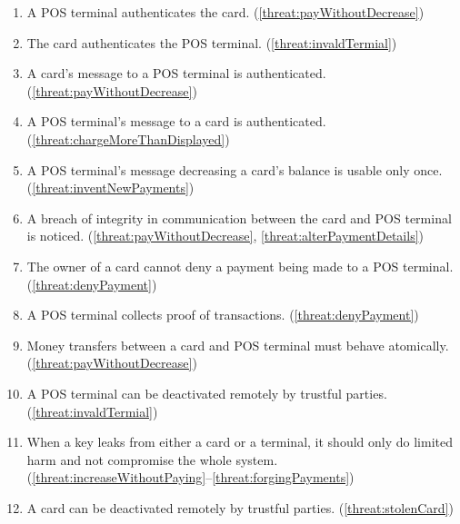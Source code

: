 \begin{enumerate}[label={SR\arabic*:}, leftmargin=3\parindent]
    \item \label{sr:POSAuthCard}
    A POS terminal authenticates the card. (\ref{threat:payWithoutDecrease})
    \item \label{sr:cardAuthPOS}
    The card authenticates the POS terminal. (\ref{threat:invaldTermial})
    \item \label{sr:POScardMessageAuth}
    A card's message to a POS terminal is authenticated. (\ref{threat:payWithoutDecrease})
    \item \label{sr:cardPOSMessageAuth}
    A POS terminal's message to a card is authenticated. (\ref{threat:chargeMoreThanDisplayed})
    \item \label{sr:noReplayDecreasingCard}
    A POS terminal's message decreasing a card's balance is usable only once. (\ref{threat:inventNewPayments})
    \item \label{sr:cardPOSMessageIntegrity}
    A breach of integrity in communication between the card and POS terminal is noticed. (\ref{threat:payWithoutDecrease}, \ref{threat:alterPaymentDetails})
    \item \label{sr:cardNonRepudiation}
    The owner of a card cannot deny a payment being made to a POS terminal. (\ref{threat:denyPayment})
    \item \label{sr:proofTransaction}
    A POS terminal collects proof of transactions. (\ref{threat:denyPayment})
    \item \label{sr:cardPOStransterAtomic}
    Money transfers between a card and POS terminal must behave atomically. (\ref{threat:payWithoutDecrease})
    \item \label{sr:disablePOS}
    A POS terminal can be deactivated remotely by trustful parties. (\ref{threat:invaldTermial})

    \item \label{sr:keyLeakage}
    When a key leaks from either a card or a terminal, it should only do limited harm and not compromise the whole system. (\ref{threat:increaseWithoutPaying}--\ref{threat:forgingPayments})
    \item \label{sr:disableCard}
    A card can be deactivated remotely by trustful parties. (\ref{threat:stolenCard})
\end{enumerate}

